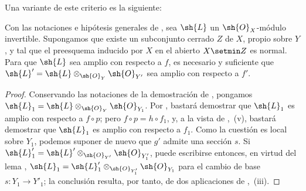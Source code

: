 Una variante de este criterio es la siguiente:

\begin{corollary}[14.5.12]
\label{IV.14.5.12}
Con las notaciones e hipótesis generales de , sea $\sh{L}$ un $\sh{O}_X$-módulo invertible.
Supongamos que existe un subconjunto cerrado $Z$ de $X$, propio sobre $Y$ , y tal que el preesquema inducido por $X$ en el abierto $X\setmin Z$ es normal.
Para que $\sh{L}$ sea amplio con respecto a $f$, es necesario y suficiente que $\sh{L}'=\sh{L}\otimes_{\sh{O}_Y}\sh{O}_{Y'}$ sea amplio con respecto a $f'$.
\end{corollary}

\begin{proof}
Conservando las notaciones de la demostración de , pongamos $\sh{L}_1=\sh{L}\otimes_{\sh{O}_Y}\sh{O}_{Y_1}$.
Por , bastará demostrar que $\sh{L}_1$ es amplio con respecto a $f\circ p$; pero $f\circ p=h\circ f_1$, y, a la vista de ,~(v), bastará demostrar que $\sh{L}_1$ es amplio con respecto a $f_1$.
Como la cuestión es local sobre $Y_1$, podemos suponer de nuevo que $g'$ admite una sección $s$.
Si $\sh{L}'_1=\sh{L}'\otimes_{\sh{O}_{Y'}}\sh{O}_{Y'_1}$, puede escribirse entonces, en virtud del lema , $\sh{L}_1=\sh{L}'_1\otimes_{\sh{O}_{Y'_1}}\sh{O}_{Y_1}$ para el cambio de base $s:Y_1\to Y'_1$; la conclusión resulta, por tanto, de dos aplicaciones de ,~(iii).
\end{proof}
